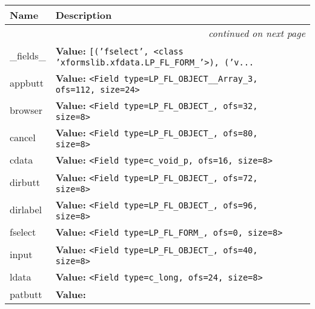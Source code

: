     \vspace{-1cm}
\hspace{\varindent}\begin{longtable}{|p{\varnamewidth}|p{\vardescrwidth}|l}
\cline{1-2}
\cline{1-2} \centering \textbf{Name} & \centering \textbf{Description}& \\
\cline{1-2}
\endhead\cline{1-2}\multicolumn{3}{r}{\small\textit{continued on next page}}\\\endfoot\cline{1-2}
\endlastfoot\raggedright \_\-f\-i\-e\-l\-d\-s\-\_\- & \raggedright \textbf{Value:} 
{\tt \texttt{[}\texttt{(}\texttt{'}\texttt{fselect}\texttt{'}\texttt{, }{\textless}class 'xformslib.xfdata.LP\_FL\_FORM\_'{\textgreater}\texttt{)}\texttt{, }\texttt{(}\texttt{'}\texttt{v}\texttt{...}}&\\
\cline{1-2}
\raggedright a\-p\-p\-b\-u\-t\-t\- & \raggedright \textbf{Value:} 
{\tt {\textless}Field type=LP\_FL\_OBJECT\_\_Array\_3, ofs=112, size=24{\textgreater}}&\\
\cline{1-2}
\raggedright b\-r\-o\-w\-s\-e\-r\- & \raggedright \textbf{Value:} 
{\tt {\textless}Field type=LP\_FL\_OBJECT\_, ofs=32, size=8{\textgreater}}&\\
\cline{1-2}
\raggedright c\-a\-n\-c\-e\-l\- & \raggedright \textbf{Value:} 
{\tt {\textless}Field type=LP\_FL\_OBJECT\_, ofs=80, size=8{\textgreater}}&\\
\cline{1-2}
\raggedright c\-d\-a\-t\-a\- & \raggedright \textbf{Value:} 
{\tt {\textless}Field type=c\_void\_p, ofs=16, size=8{\textgreater}}&\\
\cline{1-2}
\raggedright d\-i\-r\-b\-u\-t\-t\- & \raggedright \textbf{Value:} 
{\tt {\textless}Field type=LP\_FL\_OBJECT\_, ofs=72, size=8{\textgreater}}&\\
\cline{1-2}
\raggedright d\-i\-r\-l\-a\-b\-e\-l\- & \raggedright \textbf{Value:} 
{\tt {\textless}Field type=LP\_FL\_OBJECT\_, ofs=96, size=8{\textgreater}}&\\
\cline{1-2}
\raggedright f\-s\-e\-l\-e\-c\-t\- & \raggedright \textbf{Value:} 
{\tt {\textless}Field type=LP\_FL\_FORM\_, ofs=0, size=8{\textgreater}}&\\
\cline{1-2}
\raggedright i\-n\-p\-u\-t\- & \raggedright \textbf{Value:} 
{\tt {\textless}Field type=LP\_FL\_OBJECT\_, ofs=40, size=8{\textgreater}}&\\
\cline{1-2}
\raggedright l\-d\-a\-t\-a\- & \raggedright \textbf{Value:} 
{\tt {\textless}Field type=c\_long, ofs=24, size=8{\textgreater}}&\\
\cline{1-2}
\raggedright p\-a\-t\-b\-u\-t\-t\- & \raggedright \textbf{Value:} 

\end{longtable}
